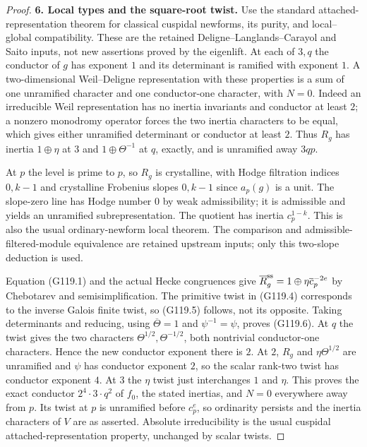 \begin{proof}
\textbf{6. Local types and the square-root twist.}
Use the standard attached-representation theorem for classical
cuspidal newforms, its purity, and local--global compatibility.
These are the retained Deligne--Langlands--Carayol and Saito
inputs, not new assertions proved by the eigenlift.
At each of $3,q$ the conductor of $g$ has exponent $1$ and its
determinant is ramified with exponent $1$.
A two-dimensional Weil--Deligne representation with these
properties is a sum of one unramified character and one
conductor-one character, with $N=0$.
Indeed an irreducible Weil representation has no inertia
invariants and conductor at least $2$; a nonzero monodromy
operator forces the two inertia characters to be equal, which
gives either unramified determinant or conductor at least $2$.
Thus $R_g$ has inertia $1\oplus\eta$ at $3$ and
$1\oplus\Theta^{-1}$ at $q$, exactly, and is unramified away
$3qp$.

At $p$ the level is prime to $p$, so $R_g$ is crystalline, with
Hodge filtration indices $0,k-1$ and crystalline Frobenius
slopes $0,k-1$ since $a_p(g)$ is a unit.
The slope-zero line has Hodge number $0$ by weak admissibility;
it is admissible and yields an unramified subrepresentation.
The quotient has inertia $c_p^{1-k}$.
This is also the usual ordinary-newform local theorem.
The comparison and admissible-filtered-module equivalence are
retained upstream inputs; only this two-slope deduction is used.

Equation (G119.1) and the actual Hecke congruences give
$\overline R_g^{\rm ss}=1\oplus\eta\overline c_p^{-2e}$
by Chebotarev and semisimplification.
The primitive twist in (G119.4) corresponds to the inverse
Galois finite twist, so (G119.5) follows, not its opposite.
Taking determinants and reducing, using $\overline\Theta=1$
and $\psi^{-1}=\psi$, proves (G119.6).
At $q$ the twist gives the two characters
$\Theta^{1/2},\Theta^{-1/2}$, both nontrivial conductor-one
characters.  Hence the new conductor exponent there is $2$.
At $2$, $R_g$ and $\eta\Theta^{1/2}$ are unramified and
$\psi$ has conductor exponent $2$, so the scalar rank-two
twist has conductor exponent $4$.
At $3$ the $\eta$ twist just interchanges $1$ and $\eta$.
This proves the exact conductor $2^4\cdot3\cdot q^2$ of $f_0$,
the stated inertias, and $N=0$ everywhere away from $p$.
Its twist at $p$ is unramified before $c_p^e$, so ordinarity
persists and the inertia characters of $V$ are as asserted.
Absolute irreducibility is the usual cuspidal attached-representation
property, unchanged by scalar twists.


\end{proof}
